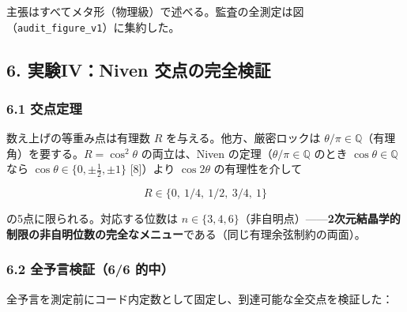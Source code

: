 \documentclass[
  a4paper,
]{ltjsarticle}
\begin{document}
主張はすべてメタ形（物理級）で述べる。監査の全測定は図（\texttt{audit\_figure\_v1}）に集約した。

\subsection{6. 実験IV：Niven
交点の完全検証}\label{ux5b9fux9a13ivniven-ux4ea4ux70b9ux306eux5b8cux5168ux691cux8a3c}

\subsubsection{6.1 交点定理}\label{ux4ea4ux70b9ux5b9aux7406}

数え上げの等重み点は有理数 \(R\) を与える。他方、厳密ロックは
\(\theta/\pi\in\mathbb{Q}\)（有理角）を要する。\(R=\cos^2\theta\)
の両立は、Niven の定理（\(\theta/\pi\in\mathbb{Q}\) のとき
\(\cos\theta\in\mathbb{Q}\) なら \(\cos\theta\in\{0,\pm\tfrac12,\pm1\}\)
{[}8{]}）より \(\cos2\theta\) の有理性を介して

\[
R\in\{0,\ 1/4,\ 1/2,\ 3/4,\ 1\}
\]

の5点に限られる。対応する位数は
\(n\in\{3,4,6\}\)（非自明点）------\textbf{2次元結晶学的制限の非自明位数の完全なメニュー}である（同じ有理余弦制約の両面）。

\subsubsection{6.2 全予言検証（6/6
的中）}\label{ux5168ux4e88ux8a00ux691cux8a3c66-ux7684ux4e2d}

全予言を測定前にコード内定数として固定し、到達可能な全交点を検証した：
\end{document}
